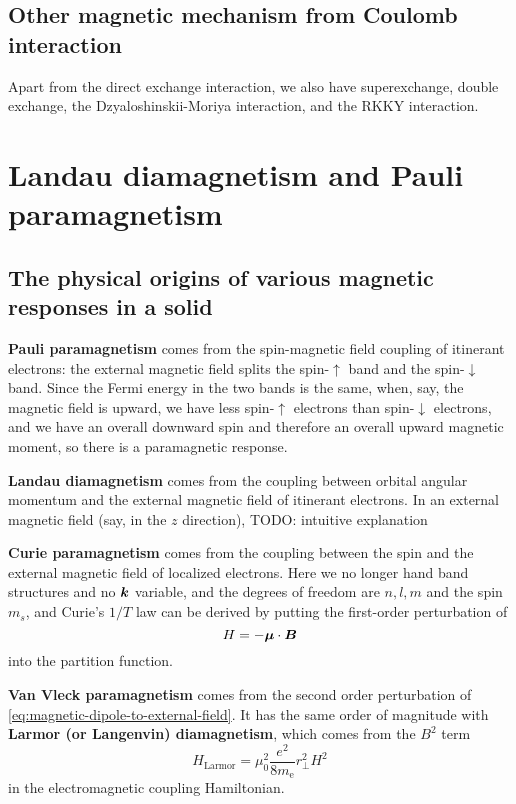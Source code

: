 \documentclass[hyperref, a4paper]{article}
\newcommand*{\concept}[1]{{\textbf{#1}}}
\begin{document}
\subsection{Other magnetic mechanism from Coulomb interaction}

Apart from the direct exchange interaction, 
we also have superexchange, double exchange, 
the Dzyaloshinskii-Moriya interaction,
and the RKKY interaction.

\section{Landau diamagnetism and Pauli paramagnetism}

\subsection{The  physical  origins  of  various  magnetic  responses  in  a  solid}

\concept{Pauli paramagnetism} comes from the spin-magnetic field coupling
of itinerant electrons: 
the external magnetic field splits 
the spin-$\uparrow$ band and the spin-$\downarrow$ band.
Since the Fermi energy in the two bands is the same, 
when, say, the magnetic field is upward, 
we have less spin-$\uparrow$ electrons than spin-$\downarrow$ electrons, 
and we have an overall downward spin 
and therefore an overall upward magnetic moment, 
so there is a paramagnetic response. 

\concept{Landau diamagnetism} comes from the coupling between orbital angular momentum
and the external magnetic field of itinerant electrons. 
In an external magnetic field (say, in the $z$ direction),
TODO: intuitive explanation

\concept{Curie paramagnetism} comes from the coupling 
between the spin and the external magnetic field 
of localized electrons.
Here we no longer hand band structures and no $\vb*{k}$ variable, 
and the degrees of freedom are $n, l, m$ and the spin $m_s$,
and Curie's $1 / T$ law can be derived by putting the first-order perturbation of
\begin{equation}
    H = - \vb*{\mu} \cdot \vb*{B} 
    \label{eq:magnetic-dipole-to-external-field}
\end{equation}
into the partition function.

\concept{Van Vleck paramagnetism} comes from 
the second order perturbation of \eqref{eq:magnetic-dipole-to-external-field}.
It has the same order of magnitude with 
\concept{Larmor (or Langenvin) diamagnetism},
which comes from the $B^2$ term 
\begin{equation}
    H_{\text{Larmor}} = \mu_0^2 \frac{e^2}{8 m_{\mathrm{e}}} r_{\perp}^2 H^2
\end{equation}
in the electromagnetic coupling Hamiltonian.
\end{document}
